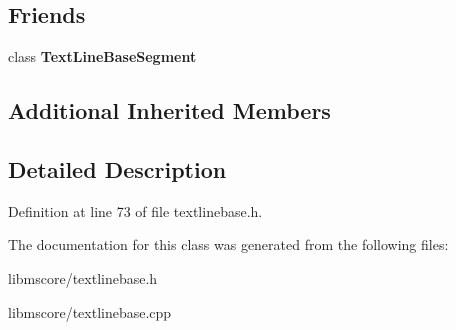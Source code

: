 \subsection*{Friends}
\begin{DoxyCompactItemize}
\item 
\mbox{\label{class_ms_1_1_text_line_base_a1877234adade48115e20f6c6a9b195b8}} 
class {\bfseries Text\+Line\+Base\+Segment}
\end{DoxyCompactItemize}
\subsection*{Additional Inherited Members}


\subsection{Detailed Description}


Definition at line 73 of file textlinebase.\+h.



The documentation for this class was generated from the following files\+:\begin{DoxyCompactItemize}
\item 
libmscore/textlinebase.\+h\item 
libmscore/textlinebase.\+cpp\end{DoxyCompactItemize}
